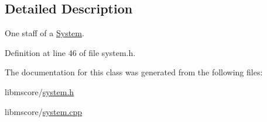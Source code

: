 \subsection{Detailed Description}
One staff of a \hyperlink{class_ms_1_1_system}{System}. 

Definition at line 46 of file system.\+h.



The documentation for this class was generated from the following files\+:\begin{DoxyCompactItemize}
\item 
libmscore/\hyperlink{system_8h}{system.\+h}\item 
libmscore/\hyperlink{system_8cpp}{system.\+cpp}\end{DoxyCompactItemize}

